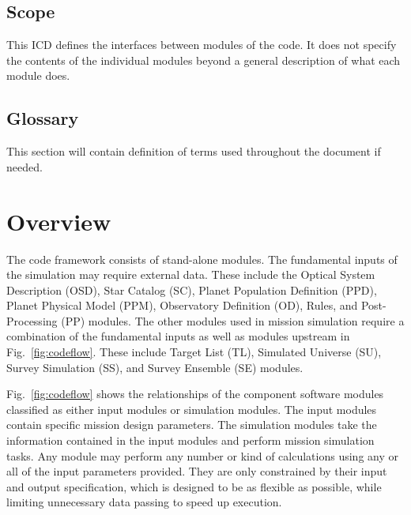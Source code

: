\documentclass[]{asme2ej}
\newcommand{\reffig}[1]{Fig.~\ref{#1}}
\begin{document}
\subsection{Scope}
This ICD defines the interfaces between modules of the code. It does not specify the contents of the individual modules beyond a general description of what each module does.

\subsection{Glossary}
This section will contain definition of terms used throughout the document if needed.


\section{Overview}
The code framework consists of stand-alone modules. The fundamental inputs of the simulation may require external data. These include the Optical System Description (OSD), Star Catalog (SC), Planet Population Definition (PPD), Planet Physical Model (PPM), Observatory Definition (OD), Rules, and Post-Processing (PP) modules. The other modules used in mission simulation require a combination of the fundamental inputs as well as modules upstream in \reffig{fig:codeflow}. These include Target List (TL), Simulated Universe (SU), Survey Simulation (SS), and Survey Ensemble (SE) modules.


\reffig{fig:codeflow} shows the relationships of the component software modules classified as either input modules or simulation modules. The input modules contain specific mission design parameters. The simulation modules take the information contained in the input modules and perform mission simulation tasks.  Any module may perform any number or kind of calculations using any or all of the input parameters provided.  They are only constrained by their input and output specification, which is designed to be as flexible as possible, while limiting unnecessary data passing to speed up execution.
\end{document}
